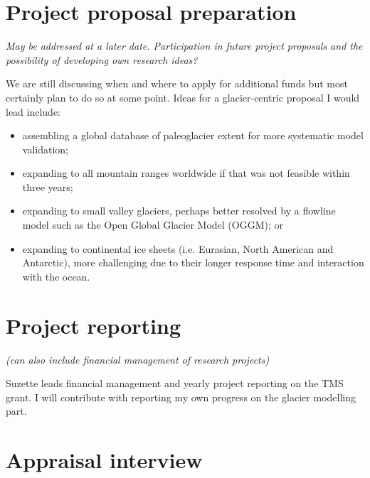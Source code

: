\documentclass{article}
\newcommand{\guideline}[1]{{\color{color2}\itshape{#1}}}
\begin{document}
\section{Project proposal preparation}

    \guideline{
        May be addressed at a later date. Participation in future project
        proposals and the possibility of developing own research ideas?}

    We are still discussing when and where to apply for additional funds but
    most certainly plan to do so at some point. Ideas for a glacier-centric
    proposal I would lead include:

    \begin{itemize}
      \item assembling a global database of paleoglacier extent for more
        systematic model validation;
      \item expanding to all mountain ranges worldwide if that was not feasible
        within three years;
      \item expanding to small valley glaciers, perhaps better resolved by
        a flowline model such as the Open Global Glacier Model (OGGM); or
      \item expanding to continental ice sheets (i.e. Eurasian, North American
        and Antarctic), more challenging due to their longer response time and
        interaction with the ocean.
    \end{itemize}


\section{Project reporting}

\guideline{
    (can also include financial management of research projects)}

    Suzette leads financial management and yearly project reporting on the TMS
    grant. I will contribute with reporting my own progress on the glacier
    modelling part.


\section{Appraisal interview}
\end{document}
